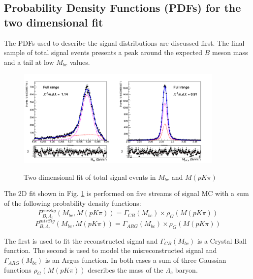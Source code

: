 \vspace{0.5 cm}
\newpage

\subsection{Probability Density Functions (PDFs) for the two dimensional fit}\label{sec:2DpdfChargedCorrBtoLambdaC}

The PDFs used to describe the signal distributions are discussed first. The final sample of total signal events presents a peak around the expected $B$ meson mass and a tail at low $M_{bc}$ values. 
\begin{figure}[H]
{\includegraphics[width=0.9\textwidth]{04-chargedCorrBtoLambda/figs/5streams_TotalSignal_charged_corrLambdaC_2Dfit.png}}
\caption{Two dimensional fit of total signal events in $M_{bc}$  and $M(p K \pi)$ }
\label{fig:5streams_TotalSignal_charged_corrLambdaC_2Dfit}
\end{figure}

The 2D fit shown in Fig. \ref{fig:5streams_TotalSignal_charged_corrLambdaC_2Dfit} is performed on five streams of signal MC with a sum of the following probability density functions:
\vspace{0.2 cm}
 \begin{equation}
        P^{recSig}_{B,\Lambda_c}(M_{bc}, M(p K \pi)) = \Gamma_{CB}(M_{bc}) \times \rho_G(M(p K \pi))
    \label{eq:RecSigEq}
\end{equation} 
\begin{equation}
        P^{misSig}_{B,\Lambda_c}(M_{bc}, M(p K \pi)) = \Gamma_{ARG}(M_{bc}) \times \rho_G(M(p K \pi))
    \end{equation}  \label{eq:MisSigEq}

The first is used to fit the reconstructed signal and $\Gamma_{CB}(M_{bc})$ is a Crystal Ball function. The second is used to model the misreconstructed signal and $\Gamma_{ARG}(M_{bc})$ is an Argus function. In both cases a sum of three Gaussian functions $\rho_G(M(p K \pi))$ describes the mass of the $\Lambda_c$ baryon.  


